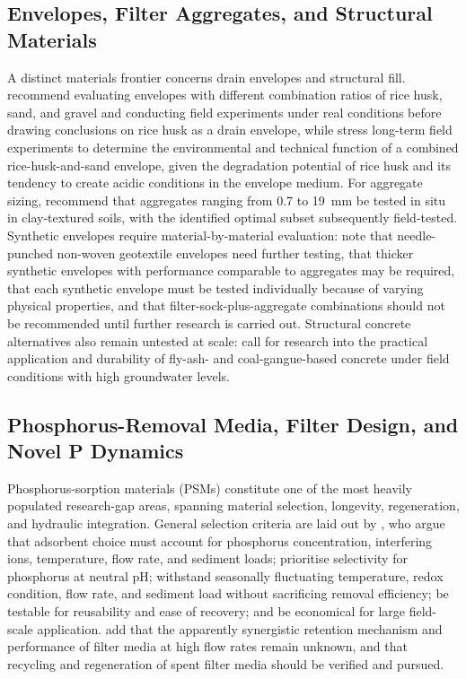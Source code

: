 \subsection{Envelopes, Filter Aggregates, and Structural Materials}
A distinct materials frontier concerns drain envelopes and structural fill. \textcite{Kaboosi2012} recommend evaluating envelopes with different combination ratios of rice husk, sand, and gravel and conducting field experiments under real conditions before drawing conclusions on rice husk as a drain envelope, while \textcite{Navabian2017} stress long-term field experiments to determine the environmental and technical function of a combined rice-husk-and-sand envelope, given the degradation potential of rice husk and its tendency to create acidic conditions in the envelope medium. For aggregate sizing, \textcite{Byrne2023} recommend that aggregates ranging from 0.7 to 19~mm be tested in situ in clay-textured soils, with the identified optimal subset subsequently field-tested. Synthetic envelopes require material-by-material evaluation: \textcite{Byrne2023b} note that needle-punched non-woven geotextile envelopes need further testing, that thicker synthetic envelopes with performance comparable to aggregates may be required, that each synthetic envelope must be tested individually because of varying physical properties, and that filter-sock-plus-aggregate combinations should not be recommended until further research is carried out. Structural concrete alternatives also remain untested at scale: \textcite{Wang2016c} call for research into the practical application and durability of fly-ash- and coal-gangue-based concrete under field conditions with high groundwater levels.

\subsection{Phosphorus-Removal Media, Filter Design, and Novel P Dynamics}
Phosphorus-sorption materials (PSMs) constitute one of the most heavily populated research-gap areas, spanning material selection, longevity, regeneration, and hydraulic integration. General selection criteria are laid out by \textcite{Li2020}, who argue that adsorbent choice must account for phosphorus concentration, interfering ions, temperature, flow rate, and sediment loads; prioritise selectivity for phosphorus at neutral pH; withstand seasonally fluctuating temperature, redox condition, flow rate, and sediment load without sacrificing removal efficiency; be testable for reusability and ease of recovery; and be economical for large field-scale application. \textcite{Mendes2022} add that the apparently synergistic retention mechanism and performance of filter media at high flow rates remain unknown, and that recycling and regeneration of spent filter media should be verified and pursued.

